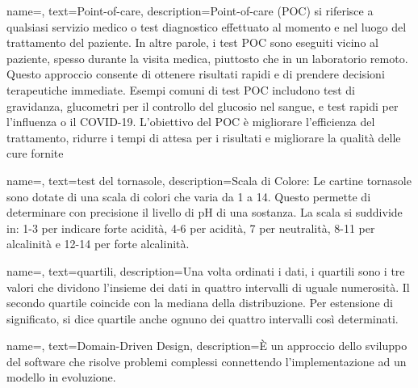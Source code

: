  {
    name=,
    text=Point-of-care,
    description={Point-of-care (POC) si riferisce a qualsiasi servizio medico o test diagnostico effettuato al momento e nel luogo del trattamento del paziente. In altre parole, i test POC sono eseguiti vicino al paziente, spesso durante la visita medica, piuttosto che in un laboratorio remoto. Questo approccio consente di ottenere risultati rapidi e di prendere decisioni terapeutiche immediate. Esempi comuni di test POC includono test di gravidanza, glucometri per il controllo del glucosio nel sangue, e test rapidi per l'influenza o il COVID-19. L'obiettivo del POC è migliorare l'efficienza del trattamento, ridurre i tempi di attesa per i risultati e migliorare la qualità delle cure fornite}
}

 {
    name=,
    text=test del tornasole,
    description={Scala di Colore: Le cartine tornasole sono dotate di una scala di colori che varia da 1 a 14. Questo permette di determinare con precisione il livello di pH di una sostanza. La scala si suddivide in: 1-3 per indicare forte acidità, 4-6 per acidità, 7 per neutralità, 8-11 per alcalinità e 12-14 per forte alcalinità.}
}

 {
    name=,
    text=quartili,
    description={Una volta ordinati i dati, i quartili sono i tre valori che dividono l'insieme dei dati in quattro intervalli di uguale numerosità. Il secondo quartile coincide con la mediana della distribuzione. Per estensione di significato, si dice quartile anche ognuno dei quattro intervalli così determinati.}
}

 {
    name=,
    text=Domain-Driven Design,
    description={È un approccio dello sviluppo del software che risolve problemi complessi connettendo l'implementazione ad un modello in evoluzione.}
}